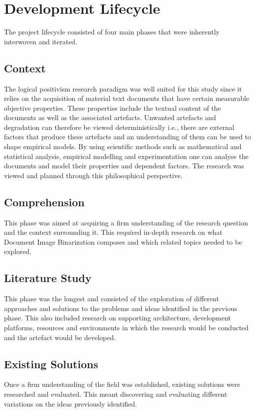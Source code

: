 \documentclass[a4paper, 12pt]{report}
\begin{document}
\newpage

\section{Development Lifecycle}
The project lifecycle consisted of four main phases that were inherently
interwoven and iterated.

\subsection{Context}
The logical positivism research paradigm was well suited for this study since
it relies on the acquisition of material text documents that have certain
measurable objective properties. These properties include the textual content
of the documents as well as the associated artefacts. Unwanted artefacts and
degradation can therefore be viewed deterministically i.e., there are external
factors that produce these artefacts and an understanding of them can be used
to shape empirical models. By using scientific methods such as mathematical and
statistical analysis, empirical modelling and experimentation one can analyse
the documents and model their properties and dependent factors. The research
was viewed and planned through this philosophical perspective.\par

\subsection{Comprehension}
This phase was aimed at acquiring a firm understanding of the research question
and the context surrounding it. This required in-depth research on what
Document Image Binarization composes and which related topics needed to be
explored.

\subsection{Literature Study}
This phase was the longest and consisted of the exploration of different
approaches and solutions to the problems and ideas identified in the previous
phase. This also included research on supporting architecture, development
platforms, resources and environments in which the research would be conducted
and the artefact would be developed.

\subsection{Existing Solutions}
Once a firm understanding of the field was established, existing solutions were
researched and evaluated. This meant discovering and evaluating different
variations on the ideas previously identified.
\end{document}
